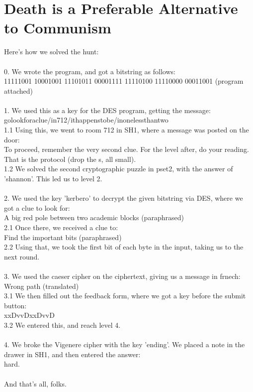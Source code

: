 \documentclass{302}
\author{Divij Singh}
\begin{document}
\section*{Death is a Preferable Alternative to Communism}
Here's how we solved the hunt:\\\\
0. We wrote the program, and got a bitstring as follows:\\
11111001 10001001 11101011 00001111 11110100 11110000 00011001 (program attached)\\\\
1. We used this as a key for the DES program, getting the message:\\
golookforaclue/in712/ithappenstobe/inonelessthantwo\\
1.1 Using this, we went to room 712 in SH1, where a message was posted on the door:\\
To proceed, remember the very second clue. For the level after, do your reading. That is the protocol (drop the s, all small).\\
1.2 We solved the second cryptographic puzzle in pset2, with the answer of  'shannon'. This led us to level 2.\\\\
2. We used the key 'kerbero' to decrypt the given bitstring via DES, where we got a clue to look for:\\
A big red pole between two academic blocks (paraphrased)\\
2.1 Once there, we received a clue to:\\
Find the important bits (paraphrased)\\
2.2 Using that, we took the first bit of each byte in the input, taking us to the next round.\\\\
3. We used the caeser cipher on the ciphertext, giving us a message in frnech:\\
Wrong path (translated)\\
3.1 We then filled out the feedback form, where we got a key before the submit button:\\
xxDvvDxxDvvD\\
3.2 We entered this, and reach level 4.\\\\
4. We broke the Vigenere cipher with the key 'ending'. We placed a note in the drawer in SH1, and then entered the answer:\\
hard.\\\\
And that's all, folks.
 
\end{document}

